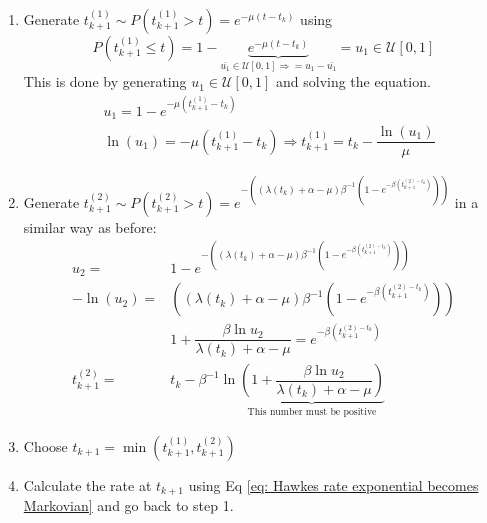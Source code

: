 \begin{enumerate}
    \item Generate $t_{k+1}^{(1)}\sim P \left( t_{k+1}^{(1)}>t \right) = e^{-\mu\left( t-t_k \right)}$ using 
    $$P\left( t_{k+1}^{(1)}\leq t \right) = 1- \underbrace{e^{-\mu(t-t_k)}}_{\bar{u_1}\in\mathcal{U}[0,1]\Rightarrow =u_1-\bar{u_1}}=u_1 \in \mathcal{U}[0,1]$$
    This is done by generating $u_1\in\mathcal{U}[0,1]$ and solving the equation.
    \begin{equation}
        \begin{split}
        &u_1=1-e^{-\mu\left( t_{k+1}^{(1)}-t_k \right)}\\
        &\ln(u_1)=-\mu\left( t_{k+1}^{(1)}-t_k  \right)\Rightarrow t_{k+1}^{(1)}=t_k-\dfrac{\ln(u_1)}{\mu}            
        \end{split}
        \label{eq: inter-event time 1}
    \end{equation}
    \item Generate $t_{k+1}^{(2)}\sim P\left( t_{k+1}^{(2)}>t \right)=e^{-\left( \left( \lambda(t_k)+\alpha-\mu \right)\beta^{-1}\left( 1-e^{-\beta\left( t_{k+1}^{(2)-t_k}\right)}\right)\right)}$
    in a similar way as before:
    \begin{equation}
        \begin{split}
            u_2=&1-e^{-\left( \left( \lambda(t_k)+\alpha-\mu \right)\beta^{-1}\left( 1-e^{-\beta\left( t_{k+1}^{(2)-t_k}\right)}\right)\right)}\\
            -\ln(u_2)=&\left( \left( \lambda(t_k)+\alpha-\mu \right)\beta^{-1}\left( 1-e^{-\beta\left( t_{k+1}^{(2)-t_k}\right)}\right)\right)\\ 
            & 1+\dfrac{\beta\ln u_2}{\lambda(t_k)+\alpha-\mu}=e^{-\beta\left( t_{k+1}^{(2)-t_k}\right)}\\
            t_{k+1}^{(2)}=&t_k-\beta^{-1}\ln\underbrace{\left( 1+\dfrac{\beta\ln u_2}{\lambda(t_k)+\alpha-\mu} \right)}_{\text{This number must be positive}}   
        \end{split}
        \label{eq: inter-event time 2}
    \end{equation}   
    \item Choose $t_{k+1}=\min\left( t_{k+1}^{(1)},t_{k+1}^{(2)} \right)$
    \item Calculate the rate at $t_{k+1}$ using Eq \ref{eq: Hawkes rate exponential becomes Markovian} and go back to step 1.
\end{enumerate}

